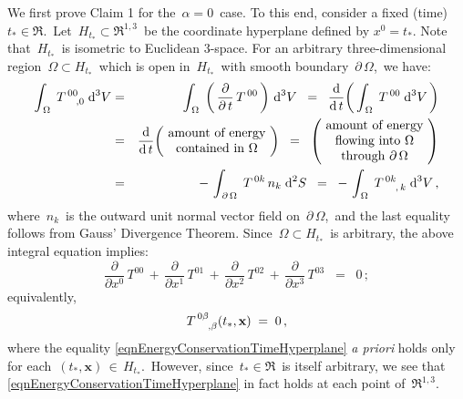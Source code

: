 \vskip 0.2cm
\noindent
We first prove Claim 1 for the \,$\alpha = 0$\, case.
To this end, consider a fixed (time) \,$ t_{*} \in \Re$.\,
Let \,$H_{t_{*}} \subset \Re^{1,3}$\, be the coordinate hyperplane defined by $x^{0} = t_{*}$.
Note that \,$H_{t_{*}}$\, is isometric to Euclidean $3$-space.
For an arbitrary three-dimensional region \,$\Omega \subset H_{t_{*}}$\, which is open in \,$H_{t_{*}}$\,
with smooth boundary \,$\partial\,\Omega$,\, we have:
\begin{eqnarray*}
\int_{\,\Omega}\;T^{\,00}_{\,{\color{white}00},0}\;\d^{3}V
& = &
	\int_{\,\Omega}\;\left(\,\dfrac{\partial}{\partial\,t}\,T^{\,00}\,\right)\,\d^{3}V
\;\; = \;\;
	\dfrac{\d}{\d\,t}\!\left(\,\int_{\,\Omega}\;T^{\,00}\;\d^{3}V\,\right)
\\
&=&
\dfrac{\d}{\d\,t}\!\left(\!\begin{array}{c}
	\textnormal{amount of energy}
	\\
	\textnormal{contained in $\Omega$}
	\end{array}\!\right)
\;\; = \;\;
	\left(\!\begin{array}{c}
		\textnormal{amount of energy}
		\\
		\textnormal{flowing into $\Omega$}
		\\
		\textnormal{through $\partial\,\Omega$}
		\end{array}\!\right)
\\
&=&
	-\,\int_{\,\partial\,\Omega}\;T^{\,0k}\,n_{k}\;\d^{2}S
\;\; = \;\;
	-\,\int_{\,\Omega}\;T^{\,0k}_{\;{\color{white}0k},\,k}\;\d^{3}V\,,
\end{eqnarray*}
where \,$n_{k}$\, is the outward unit normal vector field on \,$\partial\,\Omega$,\,
and the last equality follows from {\color{red}Gauss' Divergence Theorem}.
Since \,$\Omega \subset H_{t_{*}}$\, is arbitrary, the above integral equation implies:
\begin{equation*}
\dfrac{\partial}{\partial x^{0}}\,T^{00}
\,+\,
\dfrac{\partial}{\partial x^{1}}\,T^{01}
\,+\,
\dfrac{\partial}{\partial x^{2}}\,T^{02}
\,+\,
\dfrac{\partial}{\partial x^{3}}\,T^{03}
\;\; = \;\;
0\,;
\end{equation*}
equivalently,
\begin{equation}\label{eqnEnergyConservationTimeHyperplane}
T^{\,0\beta}_{\;{\color{white}0\beta},\beta}(t_{*},\mathbf{x}) \; = \; 0\,,
\end{equation}
where the equality \eqref{eqnEnergyConservationTimeHyperplane}
\textit{a priori} holds only for each \,$(t_{*},\mathbf{x}) \,\in\, H_{t_{*}}$.\,
However, since \,$t_{*} \in \Re$\, is itself arbitrary, we see that 
\eqref{eqnEnergyConservationTimeHyperplane} in fact holds at each point of \,$\Re^{1,3}$.\,

